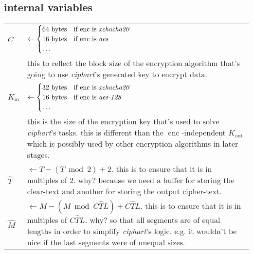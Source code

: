 \documentclass[twocolumn]{article}
\DeclareMathOperator{\enc}{enc}
\begin{document}
\subsection{internal variables}
\begin{tabularx}{\columnwidth}{lX}
    $C$         & $\gets \begin{cases}
                        64 \text{ bytes} & \text{if $\enc$ is
                                            \emph{xchacha20}}\\
                        16 \text{ bytes} & \text{if $\enc$ is \emph{aes}}\\
                        \ldots & \\
                     \end{cases}$\\
                & this to reflect the block size of the encryption
                    algorithm that's going to use \emph{ciphart}'s
                    generated key to encrypt data.\\
    $K_{\text{in}}$ & $\gets \begin{cases}
                        32 \text{ bytes} & \text{if $\enc$ is
                                            \emph{xchacha20}}\\
                        16 \text{ bytes} & \text{if $\enc$ is
                            \emph{aes-128}}\\
                        \ldots & \\
                     \end{cases}$\\
                & this is the size of the encryption key that's used to
                    solve \emph{ciphart}'s tasks.  this is different than
                    the $\enc$-independent $K_{\text{out}}$ which is
                    possibly used by other encryption algorithms in later
                    stages.\\
    $\hat T$    & $\gets T - (T \bmod 2) + 2$.  this is to
                    ensure that it is in multiples of $2$.  why?  because
                    we need a buffer for storing the clear-text and another
                    for storing the output cipher-text.\\
    $\hat M$    & $\gets M - (M \bmod C\hat TL) + C\hat TL$.  this is to
                    ensure that it is in multiples of $C\hat TL$.  why?  so
                    that all segments are of equal lengths in order to
                    simplify \emph{ciphart}'s logic.  e.g. it wouldn't be
                    nice if the last segments were of unequal sizes.\\

\end{tabularx}
\end{document}
